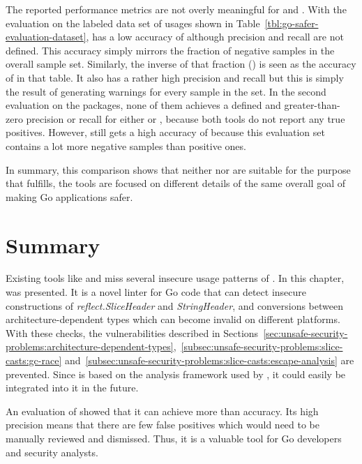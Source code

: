 The reported performance metrics are not overly meaningful for \toolVet{} and \toolGosec{}.
With the evaluation on the labeled data set of \unsafe{} usages shown in Table~\ref{tbl:go-safer-evaluation-dataset},
\toolVet{} has a low accuracy of  although precision and recall are not defined.
This accuracy simply mirrors the fraction of negative samples in the overall sample set.
Similarly, the inverse of that fraction () is seen as the accuracy of \toolGosec{} in that table.
It also has a rather high precision and recall but this is simply the result of generating warnings for every sample in
the set.
In the second evaluation on the  packages, none of them achieves a defined and greater-than-zero precision
or recall for either \toolVet{} or \toolGosec{}, because both tools do not report any true positives.
However, \toolVet{} still gets a high accuracy of  because this evaluation set contains a lot more
negative samples than positive ones.

In summary, this comparison shows that neither \toolVet{} nor \toolGosec{} are suitable for the purpose that
\toolSafer{} fulfills, the tools are focused on different details of the same overall goal of making Go applications
safer.



\section{Summary}\label{sec:go-safer:summary}

Existing tools like \toolVet{} and \toolGosec{} miss several insecure usage patterns of \unsafe{}.
In this chapter, \toolSafer{} was presented.
It is a novel linter for Go code that can detect insecure constructions of \textit{reflect.SliceHeader} and
\textit{StringHeader}, and conversions between architecture-dependent types which can become invalid on different
platforms.
With these checks, the vulnerabilities described in
Sections~\ref{sec:unsafe-security-problems:architecture-dependent-types},~\ref{subsec:unsafe-security-problems:slice-casts:gc-race}
and~\ref{subsec:unsafe-security-problems:slice-casts:escape-analysis} are prevented.
Since \toolSafer{} is based on the analysis framework used by \toolVet{}, it could easily be integrated into it in the
future.

An evaluation of \toolSafer{} showed that it can achieve more than  accuracy.
Its high precision means that there are few false positives which would need to be manually reviewed and dismissed.
Thus, it is a valuable tool for Go developers and security analysts.
